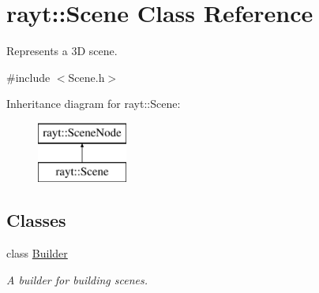 \hypertarget{classrayt_1_1_scene}{}\section{rayt\+::Scene Class Reference}
\label{classrayt_1_1_scene}


Represents a 3D scene.  




{\ttfamily \#include $<$Scene.\+h$>$}

Inheritance diagram for rayt\+::Scene\+:\begin{figure}[H]
\begin{center}
\leavevmode
\includegraphics[height=2.000000cm]{classrayt_1_1_scene}
\end{center}
\end{figure}
\subsection*{Classes}
\begin{DoxyCompactItemize}
\item 
class \mbox{\hyperlink{classrayt_1_1_scene_1_1_builder}{Builder}}
\begin{DoxyCompactList}\small\item\em A builder for building scenes. \end{DoxyCompactList}\end{DoxyCompactItemize}
